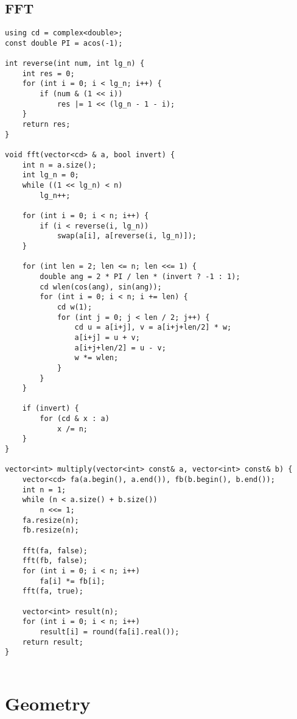 \documentclass{article}
\begin{document}
\subsection{FFT}
\begin{lstlisting}
using cd = complex<double>;
const double PI = acos(-1);

int reverse(int num, int lg_n) {
    int res = 0;
    for (int i = 0; i < lg_n; i++) {
        if (num & (1 << i))
            res |= 1 << (lg_n - 1 - i);
    }
    return res;
}

void fft(vector<cd> & a, bool invert) {
    int n = a.size();
    int lg_n = 0;
    while ((1 << lg_n) < n)
        lg_n++;

    for (int i = 0; i < n; i++) {
        if (i < reverse(i, lg_n))
            swap(a[i], a[reverse(i, lg_n)]);
    }

    for (int len = 2; len <= n; len <<= 1) {
        double ang = 2 * PI / len * (invert ? -1 : 1);
        cd wlen(cos(ang), sin(ang));
        for (int i = 0; i < n; i += len) {
            cd w(1);
            for (int j = 0; j < len / 2; j++) {
                cd u = a[i+j], v = a[i+j+len/2] * w;
                a[i+j] = u + v;
                a[i+j+len/2] = u - v;
                w *= wlen;
            }
        }
    }

    if (invert) {
        for (cd & x : a)
            x /= n;
    }
}

vector<int> multiply(vector<int> const& a, vector<int> const& b) {
    vector<cd> fa(a.begin(), a.end()), fb(b.begin(), b.end());
    int n = 1;
    while (n < a.size() + b.size()) 
        n <<= 1;
    fa.resize(n);
    fb.resize(n);

    fft(fa, false);
    fft(fb, false);
    for (int i = 0; i < n; i++)
        fa[i] *= fb[i];
    fft(fa, true);

    vector<int> result(n);
    for (int i = 0; i < n; i++)
        result[i] = round(fa[i].real());
    return result;
}


\end{lstlisting}
\section{Geometry}
\end{document}
